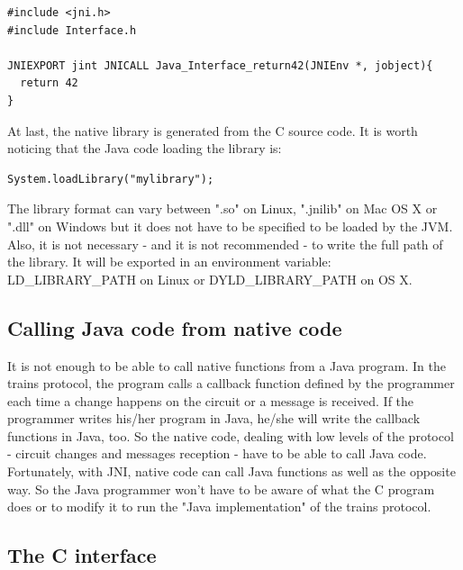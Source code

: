 \documentclass[a4paper,10pt]{report}
\begin{document}
\lstset{language=C}
\lstset{commentstyle=\textit} 
\begin{lstlisting}
#include <jni.h>
#include Interface.h

JNIEXPORT jint JNICALL Java_Interface_return42(JNIEnv *, jobject){
  return 42
}

\end{lstlisting}

At last, the native library is generated from the C source code. It is worth noticing that the Java code loading the library is: \\
\lstset{language=java}
\lstset{commentstyle=\textit} 
\begin{lstlisting}
System.loadLibrary("mylibrary");
\end{lstlisting}

The library format can vary between ".so" on Linux, ".jnilib" on Mac OS X or ".dll" on Windows but it does not have to be specified to be loaded by the JVM.
Also, it is not necessary - and it is not recommended - to write the full path of the library. It will be exported in an environment variable: LD\_LIBRARY\_PATH on Linux or
DYLD\_LIBRARY\_PATH on OS X.

\subsection{Calling Java code from native code}

It is not enough to be able to call native functions from a Java program. In the trains protocol, the program calls a callback function defined by the programmer each time a change happens on the circuit
or a message is received.
If the programmer writes his/her program in Java, he/she will write the callback functions in Java, too. So the native code, dealing with
low levels of the protocol - circuit changes and messages reception - have to be able to call Java code.
Fortunately, with JNI, native code can call Java functions as well as the opposite way. So the Java programmer won't have to be aware of
what the C program does or to modify it to run the "Java implementation" of the trains protocol.  

\subsection{The C interface}
\end{document}

